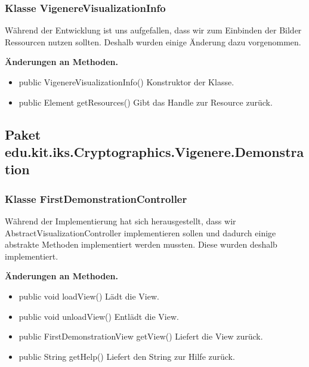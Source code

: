 \documentclass{article}
\begin{document}
    \subsubsection{Klasse VigenereVisualizationInfo}
	Während der Entwicklung ist uns aufgefallen, dass wir zum Einbinden der Bilder Ressourcen nutzen sollten. Deshalb wurden einige Änderung dazu vorgenommen.\newline
           
    \textbf{Änderungen an Methoden.}
      \begin{itemize}
		\item public VigenereVisualizationInfo()\newline
              Konstruktor der Klasse.
        \item public Element getResources()\newline
              Gibt das Handle zur Resource zurück.
      \end{itemize}

  \subsection{Paket edu.kit.iks.Cryptographics.Vigenere.Demonstration}
    \subsubsection{Klasse FirstDemonstrationController}
	Während der Implementierung hat sich herausgestellt, dass wir AbstractVisualizationController implementieren sollen und dadurch 
	einige abstrakte Methoden implementiert werden mussten. Diese wurden deshalb implementiert.\newline
           
    \textbf{Änderungen an Methoden.}
      \begin{itemize}
		\item public void loadView()\newline
              Lädt die View.
        \item public void unloadView()\newline
              Entlädt die View.
        \item public FirstDemonstrationView getView()\newline
              Liefert die View zurück.
        \item public String getHelp()\newline
              Liefert den String zur Hilfe zurück.
      \end{itemize}
	  
\end{document}
